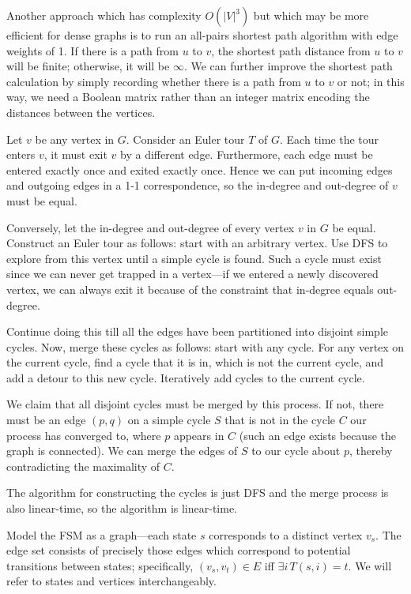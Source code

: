 Another approach which has complexity $O(|V|^3)$ but which may be
more efficient for dense graphs is to run an all-pairs shortest path algorithm
with edge weights of 1.  If there is a path from $u$ to $v$, the 
shortest path distance from $u$ to $v$ will be finite; otherwise, it
will be $\infty$.  We can further improve the shortest path calculation
by simply recording whether there is a path from $u$ to $v$ or not; in this
way, we need a Boolean matrix rather than an integer matrix encoding the
distances between the vertices.

Let $v$ be any vertex in $G$.
Consider an Euler tour $T$ of $G$.
Each time the tour enters $v$, it must exit $v$ by a different edge.  Furthermore,
each edge must be entered exactly once and exited exactly once.  Hence
we can put incoming edges and outgoing edges in a 1-1 correspondence, so
the in-degree and out-degree of $v$ must be equal.

Conversely, let the in-degree and out-degree of every vertex $v$ in $G$ be equal.
Construct an Euler tour as follows:
start with an arbitrary vertex.  Use DFS to explore from this vertex until a simple cycle is found.
Such a cycle must exist since we can never get trapped in a vertex---if we entered a newly discovered vertex, we can
always exit it because of the constraint that in-degree equals out-degree.

Continue doing this till all the edges have been partitioned into disjoint simple cycles.  Now, merge these cycles as follows: start with any cycle.  For any vertex on the
current cycle, find a cycle that it is in, which is not the current cycle, and add a detour to this new cycle.
Iteratively add cycles to the current cycle.

We claim that all disjoint cycles must be merged by this process.
If not, there must be an edge $(p,q)$ on a simple cycle $S$ that is not in
 the cycle $C$ our process has converged to, where   $p$ appears in $C$ (such
an edge exists because the graph is connected).  We can merge the edges of $S$ to our cycle
about $p$, thereby contradicting the maximality of $C$.

The algorithm for constructing the cycles is just DFS and the merge process is also linear-time, so the algorithm is linear-time.

Model the FSM as a graph---each state $s$ corresponds to a distinct vertex $v_s$.
The edge set consists of precisely those edges
which correspond to potential
transitions between states;
specifically, $(v_s,v_t) \in E$ iff $\exists i \, T(s,i) = t$.  We will refer to states
and vertices interchangeably.

